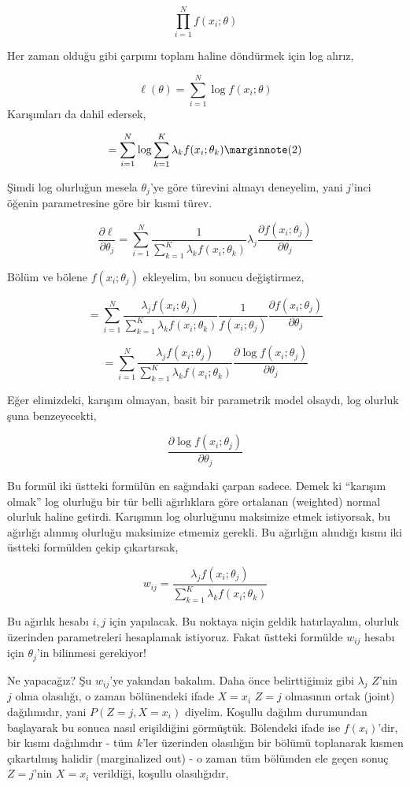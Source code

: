 \documentclass[12pt,fleqn]{article}\usepackage{../../common}
\begin{document}
$$ \prod_{i=1}^{N} f(x_i;\theta) $$

Her zaman olduğu gibi çarpımı toplam haline döndürmek için log alırız, 

$$ \ell(\theta) = \sum_{i=1}^{N} \log f(x_i;\theta) $$
Karışımları da dahil edersek,

$$ = \sum_{i=1}^{N} \log \sum_{k=1}^{K} \lambda_k f(x_i;\theta_k) 
\mlabel{2}
$$

Şimdi log olurluğun mesela $\theta_j$'ye göre türevini almayı deneyelim,
yani $j$'inci öğenin parametresine göre bir kısmi türev. 

$$ \frac{\partial \ell}{\partial \theta_j}  = 
\sum_{i=1}^{N}  \frac{1}{\sum_{k=1}^{K} \lambda_k f(x_i;\theta_k) } 
\lambda_j
\frac{\partial f(x_i;\theta_j)}{\partial \theta_j}
$$

Bölüm ve bölene $f(x_i;\theta_j)$ ekleyelim, bu sonucu değiştirmez, 

$$ = \sum_{i=1}^{N}  
\frac{\lambda_j f(x_i;\theta_j)}{\sum_{k=1}^{K} \lambda_k f(x_i;\theta_k)}
\frac{1}{f(x_i;\theta_j)}
\frac{\partial f(x_i;\theta_j)}{\partial \theta_j}
$$

$$ = \sum_{i=1}^{N}  
\frac{\lambda_j f(x_i;\theta_j)}{\sum_{k=1}^{K} \lambda_k f(x_i;\theta_k)}
\frac{\partial \log f(x_i;\theta_j)}{\partial \theta_j}
$$

Eğer elimizdeki, karışım olmayan, basit bir parametrik model olsaydı, log
olurluk şuna benzeyecekti, 

$$ \frac{\partial \log f(x_i;\theta_j)}{\partial \theta_j} $$

Bu formül iki üstteki formülün en sağındaki çarpan sadece. Demek ki
``karışım olmak'' log olurluğu bir tür belli ağırlıklara göre ortalanan
(weighted) normal olurluk haline getirdi. Karışımın log olurluğunu
maksimize etmek istiyorsak, bu ağırlığı alınmış olurluğu maksimize etmemiz
gerekli. Bu ağırlığın alındığı kısmı iki üstteki formülden çekip
çıkartırsak, 

$$ w_{ij} = \frac{\lambda_j f(x_i;\theta_j)}{\sum_{k=1}^{K} \lambda_k f(x_i;\theta_k)} $$

Bu ağırlık hesabı $i,j$ için yapılacak. Bu noktaya niçin geldik
hatırlayalım, olurluk üzerinden parametreleri hesaplamak istiyoruz. Fakat
üstteki formülde $w_{ij}$ hesabı için $\theta_j$'in bilinmesi gerekiyor!

Ne yapacağız? Şu $w_{ij}$'ye yakından bakalım. Daha önce belirttiğimiz gibi
$\lambda_j$ $Z$'nin $j$ olma olasılığı, o zaman bölünendeki ifade $X = x_i$
$Z=j$ olmasının ortak (joint) dağılımıdır, yani $P(Z=j,X=x_i)$
diyelim. Koşullu dağılım durumundan başlayarak bu sonuca nasıl
erişildiğini görmüştük. Bölendeki ifade ise $f(x_i)$'dir, bir kısmı
dağılımdır - tüm $k$'ler üzerinden olasılığın bir bölümü toplanarak kısmen
çıkartılmış halidir (marginalized out) - o zaman tüm bölümden ele geçen
sonuç $Z=j$'nin $X=x_i$ verildiği, koşullu olasılığıdır,
\end{document}

